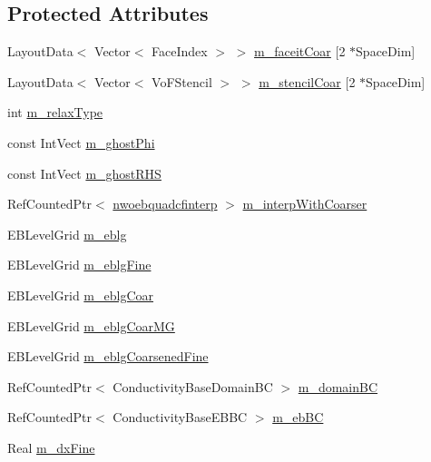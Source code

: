 \subsection*{Protected Attributes}
\begin{DoxyCompactItemize}
\item 
Layout\+Data$<$ Vector$<$ Face\+Index $>$ $>$ \hyperlink{classnwoebconductivityop_aa357d5ddcd66dac5ab4703e97a8db7d0}{m\+\_\+faceit\+Coar} \mbox{[}2 $\ast$Space\+Dim\mbox{]}
\item 
Layout\+Data$<$ Vector$<$ Vo\+F\+Stencil $>$ $>$ \hyperlink{classnwoebconductivityop_a135457eeceb1e2d2c4f145883bfcf551}{m\+\_\+stencil\+Coar} \mbox{[}2 $\ast$Space\+Dim\mbox{]}
\item 
int \hyperlink{classnwoebconductivityop_ac378b4c945c1a87aaa0715101e2de6ab}{m\+\_\+relax\+Type}
\item 
const Int\+Vect \hyperlink{classnwoebconductivityop_a4441723c67c5fc9b73d2f05c227d0780}{m\+\_\+ghost\+Phi}
\item 
const Int\+Vect \hyperlink{classnwoebconductivityop_a37c7e0d842dac341e29050e1cdc085c4}{m\+\_\+ghost\+R\+HS}
\item 
Ref\+Counted\+Ptr$<$ \hyperlink{classnwoebquadcfinterp}{nwoebquadcfinterp} $>$ \hyperlink{classnwoebconductivityop_a383804b8bbc133d6673d977f88d6bdc0}{m\+\_\+interp\+With\+Coarser}
\item 
E\+B\+Level\+Grid \hyperlink{classnwoebconductivityop_aaa22b991b43d535ae41e40383d233846}{m\+\_\+eblg}
\item 
E\+B\+Level\+Grid \hyperlink{classnwoebconductivityop_a29eb8ad7c8ccc5d3a15b970e1a4ed834}{m\+\_\+eblg\+Fine}
\item 
E\+B\+Level\+Grid \hyperlink{classnwoebconductivityop_a7ec6968607d68f7ce78fdf91705d8206}{m\+\_\+eblg\+Coar}
\item 
E\+B\+Level\+Grid \hyperlink{classnwoebconductivityop_a6ce53bff56532a77f4036e16816dcb66}{m\+\_\+eblg\+Coar\+MG}
\item 
E\+B\+Level\+Grid \hyperlink{classnwoebconductivityop_a20e0e73315a68f38fa6585c7958de431}{m\+\_\+eblg\+Coarsened\+Fine}
\item 
Ref\+Counted\+Ptr$<$ Conductivity\+Base\+Domain\+BC $>$ \hyperlink{classnwoebconductivityop_aac893509676898f0821bc685f6ff03af}{m\+\_\+domain\+BC}
\item 
Ref\+Counted\+Ptr$<$ Conductivity\+Base\+E\+B\+BC $>$ \hyperlink{classnwoebconductivityop_af44b8cada394c01a5b73c0890559e521}{m\+\_\+eb\+BC}
\item 
Real \hyperlink{classnwoebconductivityop_a5850ad97771478b6689c8ad1f9c1e069}{m\+\_\+dx\+Fine}

\end{DoxyCompactItemize}
